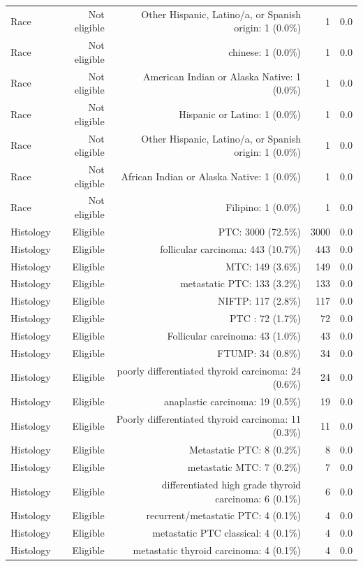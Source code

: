\begin{table}[htbp]
\begin{tabular}{lrrrr}
Race & Not eligible &  Other Hispanic, Latino/a, or Spanish origin: 1 (0.0\%) & 1 & 0.0 \\
Race & Not eligible & chinese: 1 (0.0\%) & 1 & 0.0 \\
Race & Not eligible & American Indian or Alaska Native: 1 (0.0\%) & 1 & 0.0 \\
Race & Not eligible & Hispanic or Latino: 1 (0.0\%) & 1 & 0.0 \\
Race & Not eligible & Other Hispanic, Latino/a, or Spanish origin: 1 (0.0\%) & 1 & 0.0 \\
Race & Not eligible & African Indian or Alaska Native: 1 (0.0\%) & 1 & 0.0 \\
Race & Not eligible & Filipino: 1 (0.0\%) & 1 & 0.0 \\
Histology & Eligible & PTC: 3000 (72.5\%) & 3000 & 0.0 \\
Histology & Eligible & follicular carcinoma: 443 (10.7\%) & 443 & 0.0 \\
Histology & Eligible & MTC: 149 (3.6\%) & 149 & 0.0 \\
Histology & Eligible & metastatic PTC: 133 (3.2\%) & 133 & 0.0 \\
Histology & Eligible & NIFTP: 117 (2.8\%) & 117 & 0.0 \\
Histology & Eligible & PTC : 72 (1.7\%) & 72 & 0.0 \\
Histology & Eligible & Follicular carcinoma: 43 (1.0\%) & 43 & 0.0 \\
Histology & Eligible & FTUMP: 34 (0.8\%) & 34 & 0.0 \\
Histology & Eligible & poorly differentiated thyroid carcinoma: 24 (0.6\%) & 24 & 0.0 \\
Histology & Eligible & anaplastic carcinoma: 19 (0.5\%) & 19 & 0.0 \\
Histology & Eligible & Poorly differentiated thyroid carcinoma: 11 (0.3\%) & 11 & 0.0 \\
Histology & Eligible & Metastatic PTC: 8 (0.2\%) & 8 & 0.0 \\
Histology & Eligible & metastatic MTC: 7 (0.2\%) & 7 & 0.0 \\
Histology & Eligible & differentiated high grade thyroid carcinoma: 6 (0.1\%) & 6 & 0.0 \\
Histology & Eligible & recurrent/metastatic PTC: 4 (0.1\%) & 4 & 0.0 \\
Histology & Eligible & metastatic PTC classical: 4 (0.1\%) & 4 & 0.0 \\
Histology & Eligible & metastatic thyroid carcinoma: 4 (0.1\%) & 4 & 0.0 \\

\end{tabular}
\end{table}
